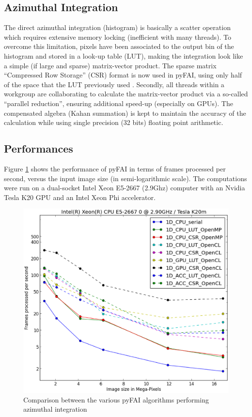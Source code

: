 \documentclass[preprint]{iucr}
\begin{document}
\subsection{Azimuthal Integration}
The direct azimuthal integration (histogram) is basically a scatter operation
which requires extensive memory locking (inefficient with many threads).
To overcome this limitation, pixels have been
associated to the output bin of the histogram and stored in a look-up
table (LUT), making the integration look like a simple (if large and sparse)
matrix-vector product.
The sparse matrix ``Compressed Row Storage'' (CSR) format is now used in pyFAI,
using only half of the space that the LUT previously used \cite{PyFAI_PDJ}.
Secondly, all threads within a workgroup are collaborating to calculate the
matrix-vector product via a so-called ``parallel reduction'', ensuring
additional speed-up (especially on GPUs).
The compensated algebra (Kahan summation) is kept to maintain the accuracy
of the calculation while using single precision (32 bits) floating point
arithmetic.

\subsection{Performances}
Figure \ref{benchmark} shows the performance of pyFAI in terms of frames
processed per second, versus the input image size (in semi-logarithmic scale).
The computations were run on a dual-socket Intel Xeon
E5-2667 (2.9Ghz) computer with an Nvidia Tesla K20 GPU and an Intel Xeon Phi accelerator.

\begin{figure}
\label{benchmark}
\begin{center}
\includegraphics[width=15cm]{benchmark.eps}
\caption{Comparison between the various pyFAI algorithms performing
azimuthal integration}
\end{center}
\end{figure}
\end{document}
